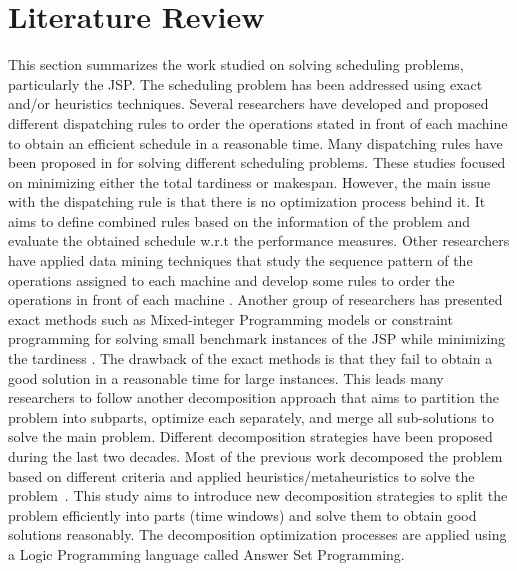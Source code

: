 \documentclass[submission,copyright,creativecommons]{eptcs}
\begin{document}
\section{Literature Review}
This section summarizes the work studied on solving scheduling problems, particularly the JSP. The scheduling problem has been addressed using exact and/or heuristics techniques. Several researchers have developed and proposed different dispatching rules to order the operations stated in front of each machine to obtain an efficient schedule in a reasonable time. Many dispatching rules have been proposed in \cite{holthaus1997efficient,kaban2012comparison,paul2015investigation} for solving different scheduling problems. These studies focused on minimizing either the total tardiness or makespan. However, the main issue with the dispatching rule is that there is no optimization process behind it. It aims to define combined rules based on the information of the problem and evaluate the obtained schedule w.r.t the performance measures. Other researchers have applied data mining techniques that study the sequence pattern of the operations assigned to each machine and develop some rules to order the operations in front of each machine \cite{shahzad2010discovering,koonce2000using}. Another group of researchers has presented exact methods such as Mixed-integer Programming models or constraint programming for solving small benchmark instances of the JSP while minimizing the tardiness \cite{ku2016mixed,meng2020mixed}. The drawback of the exact methods is that they fail to obtain a good solution in a reasonable time for large instances. This leads many researchers to follow another decomposition approach that aims to partition the problem into subparts, optimize each separately, and merge all sub-solutions to solve the main problem. Different decomposition strategies have been proposed during the last two decades. Most of the previous work decomposed the problem based on different criteria and applied heuristics/metaheuristics to solve the problem~\cite{singer2001decomposition, zhai2014decomposition,byeon1998decomposition}. This study aims to introduce new decomposition strategies to split the problem efficiently into parts (time windows) and solve them to obtain good solutions reasonably. The decomposition optimization processes are applied using a Logic Programming language called Answer Set Programming.
\end{document}
